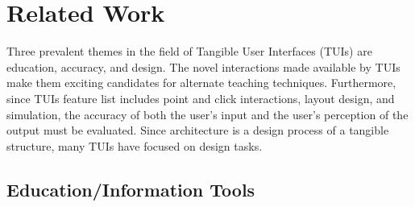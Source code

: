 \documentclass[review]{vgtc}                 %
\begin{document}
\section{Related Work}


Three prevalent themes in the field of Tangible User Interfaces (TUIs)
are education, accuracy, and design.  
The novel interactions made available by TUIs make them exciting
candidates for alternate teaching techniques.  Furthermore, since TUIs
feature list includes
point and click interactions, layout design, and simulation, the
accuracy of both the user's input and the user's perception of the
output must be evaluated.  Since architecture is a design process of a
tangible structure, many TUIs have focused on design tasks.




\subsection{Education/Information Tools}
\end{document}
